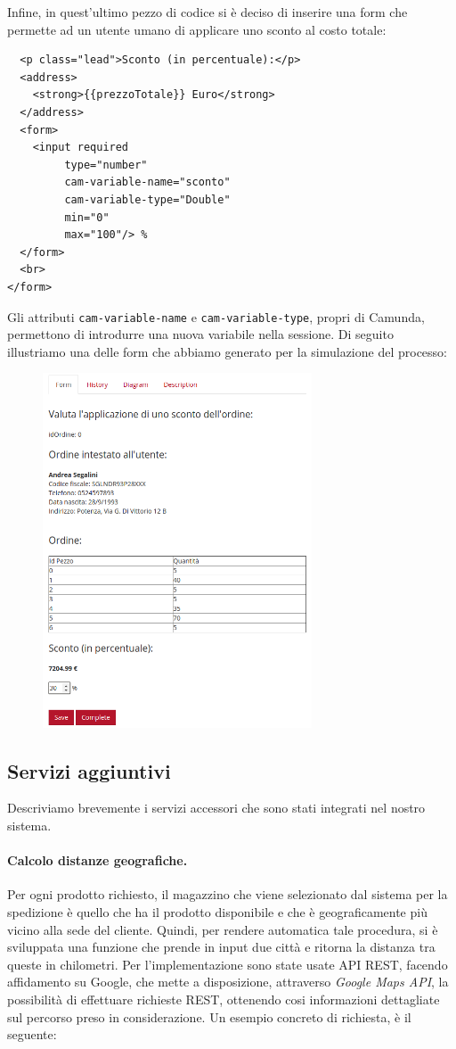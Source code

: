 \documentclass[twoside]{article}
\begin{document}
Infine, in quest'ultimo pezzo di codice si è deciso di inserire una form che permette
ad un utente umano di applicare uno sconto al costo totale:
\begin{lstlisting}
  <p class="lead">Sconto (in percentuale):</p>
  <address>
    <strong>{{prezzoTotale}} Euro</strong>
  </address>
  <form>
    <input required
         type="number"
         cam-variable-name="sconto"
         cam-variable-type="Double"
         min="0" 
         max="100"/> %
  </form>
  <br>
</form>
\end{lstlisting}
Gli attributi \texttt{cam-variable-name} e \texttt{cam-variable-type}, propri di Camunda,
permettono di introdurre una nuova variabile nella sessione.
\newpage
Di seguito illustriamo una delle form che abbiamo generato per
la simulazione del processo:
\begin{figure}[!htbp]
\centering
\includegraphics[width=8cm]{screen-form-sconto.png}
\label{fig:sconto}
\end{figure}

\subsection{Servizi aggiuntivi}
Descriviamo brevemente i servizi accessori che sono stati integrati nel nostro sistema.

\paragraph{Calcolo distanze geografiche.}
Per ogni prodotto richiesto, il magazzino che viene selezionato dal sistema per la spedizione
è quello che ha il prodotto disponibile e che è geograficamente più vicino alla sede del cliente.
Quindi, per rendere automatica tale procedura, si è sviluppata una funzione che prende in input
due città e ritorna la distanza tra queste in chilometri.
Per l'implementazione sono state usate API REST, facendo affidamento su Google, che mette a disposizione,
attraverso \emph{Google Maps API}, la possibilità di effettuare richieste REST, ottenendo cosi
informazioni dettagliate sul percorso preso in considerazione.
Un esempio concreto di richiesta, è il seguente:
\end{document}
